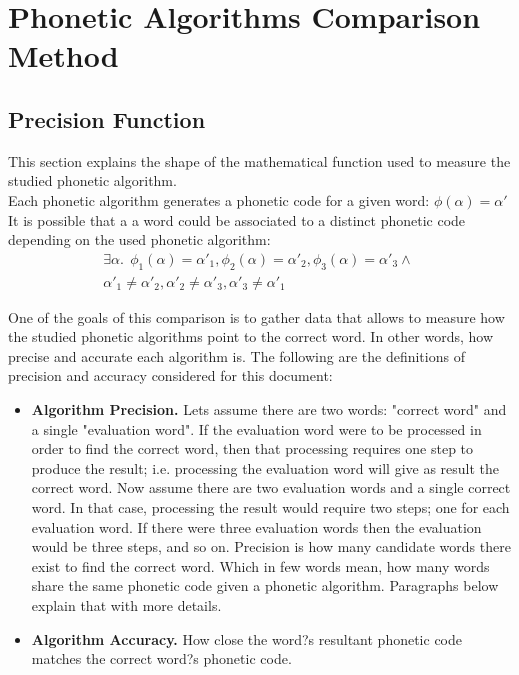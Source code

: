 \documentclass[9pt,conference]{IEEEtran}
\begin{document}
\section{Phonetic Algorithms Comparison Method}
\subsection{Precision Function}
\label{sec:PrecisionFunction} 
This section explains the shape of the mathematical function used to measure the studied
phonetic algorithm. \\

Each phonetic algorithm generates a phonetic code for a given word: $\phi(\alpha)=\alpha'$
It is possible that a a word could be associated to a distinct phonetic code depending on
the used phonetic algorithm:
\begin{multline}
\exists\alpha.\ \ \phi_1(\alpha)=\alpha'_1,\phi_2(\alpha)=\alpha'_2,\phi_3(\alpha)=\alpha'_3 \land\ \\ \alpha'_1\ne\alpha'_2,\alpha'_2\ne\alpha'_3,\alpha'_3\ne\alpha'_1
\end{multline}

One of the goals of this comparison is to gather data that allows to measure how the studied
phonetic algorithms point to the correct word. In other words, how precise and accurate each
algorithm is. The following are the definitions of precision and accuracy considered for this
document:\\

\begin{itemize}
\item \textbf{Algorithm Precision.} Lets assume there are two words: "correct word" and a 
single "evaluation word". If the evaluation word were to be processed in order to find the 
correct word, then that processing requires one step to produce the result; i.e. processing 
the evaluation word will give as result the correct word. Now assume there are two
evaluation words and a single correct word. In that case, processing the result would 
require two steps; one for each evaluation word. If there were three evaluation words
then the evaluation would be three steps, and so on. Precision is how many candidate
words there exist to find the correct word. Which in few words mean, how many words 
share the same phonetic 
code given a phonetic algorithm. Paragraphs below explain that with more details.\\
\item \textbf{Algorithm Accuracy.} How close the word?s resultant phonetic code 
matches the correct word?s phonetic code.\\
\end{itemize}
\end{document}
